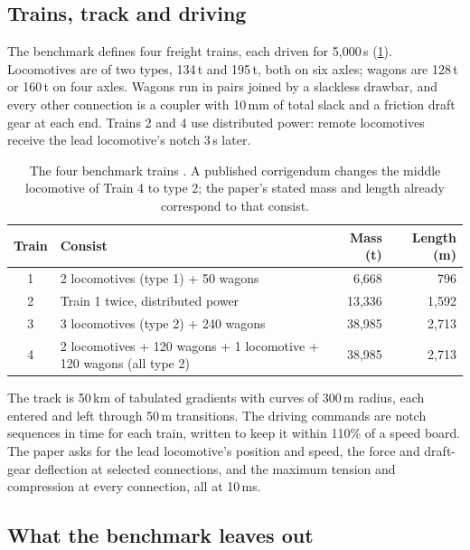 \subsection{Trains, track and driving}

The benchmark defines four freight trains, each driven for 5,000\,s (\cref{tab:bench_trains}). Locomotives are of two types, 134\,t and 195\,t, both on six axles; wagons are 128\,t or 160\,t on four axles. Wagons run in pairs joined by a slackless drawbar, and every other connection is a coupler with 10\,mm of total slack and a friction draft gear at each end. Trains 2 and 4 use distributed power: remote locomotives receive the lead locomotive's notch 3\,s later.

\begin{table}[htbp]
    \centering
    \small
    \begin{tabular}{c>{\raggedright}p{7.2cm}rr}
        \toprule
        Train & Consist & Mass (t) & Length (m) \\
        \midrule
        1 & 2 locomotives (type 1) + 50 wagons & 6,668 & 796 \\
        2 & Train 1 twice, distributed power & 13,336 & 1,592 \\
        3 & 3 locomotives (type 2) + 240 wagons & 38,985 & 2,713 \\
        4 & 2 locomotives + 120 wagons + 1 locomotive + 120 wagons (all type 2) & 38,985 & 2,713 \\
        \bottomrule
    \end{tabular}
    \caption{The four benchmark trains \cite{Spiryagin2017BenchmarkQuestions}. A published corrigendum changes the middle locomotive of Train 4 to type 2; the paper's stated mass and length already correspond to that consist.}
    \label{tab:bench_trains}
\end{table}

The track is 50\,km of tabulated gradients with curves of 300\,m radius, each entered and left through 50\,m transitions. The driving commands are notch sequences in time for each train, written to keep it within 110\% of a speed board. The paper asks for the lead locomotive's position and speed, the force and draft-gear deflection at selected connections, and the maximum tension and compression at every connection, all at 10\,ms.

\subsection{What the benchmark leaves out}

